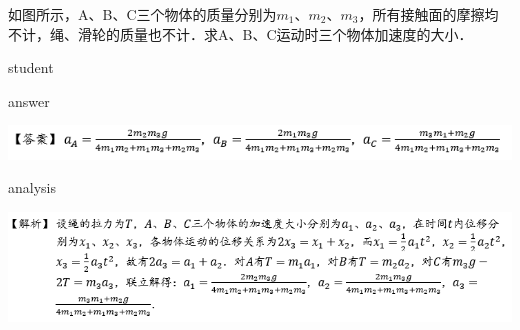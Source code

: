 \begin{example}
	如图所示，A、B、C三个物体的质量分别为$ m_1 $、$ m_2 $、$ m_3 $，所有接触面的摩擦均不计，绳、滑轮的质量也不计．求A、B、C运动时三个物体加速度的大小．
	
	\begin{taggedblock}{student}
		\vspace*{2cm}
	\end{taggedblock}
	
	
	\begin{taggedblock}{answer}
		\begin{center}
			\includegraphics[width=0.9\linewidth]{image/newton-13}
		\end{center}
	\end{taggedblock}
	
	
	\begin{taggedblock}{analysis}
			\begin{center}
				\includegraphics[width=0.9\linewidth]{image/newton-14}
			\end{center}
	\end{taggedblock}
\end{example}



